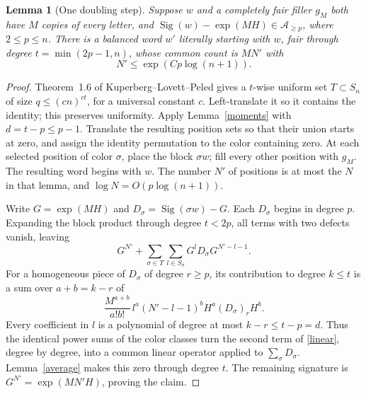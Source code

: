 \documentclass[11pt]{article}
\newtheorem{lemma}{Lemma}
\newcommand{\Sig}{\operatorname{Sig}}
\begin{document}
\begin{lemma}[One doubling step]\label{double}
Suppose $w$ and a completely fair filler $g_M$ both have $M$ copies of
every letter, and $\Sig(w)-\exp(MH)\in\mathcal A_{\ge p}$, where
$2\le p\le n$. There is a balanced word $w'$ literally starting with
$w$, fair through degree $t=\min(2p-1,n)$, whose common count is
$M N'$ with
\[
 N'\le\exp(Cp\log(n+1)).
\]
\end{lemma}
\begin{proof}
Theorem~1.6 of Kuperberg--Lovett--Peled gives a $t$-wise uniform set
$T\subset S_n$ of size $q\le(cn)^{ct}$, for a universal constant $c$.
Left-translate it so it contains the identity; this preserves uniformity.
Apply Lemma~\ref{moments} with $d=t-p\le p-1$.
Translate the resulting position sets so that their union starts at zero,
and assign the identity permutation to the color containing zero.
At each selected position of color $\sigma$, place the block $\sigma w$;
fill every other position with $g_M$. The resulting word begins with $w$.
The number $N'$ of positions is at most the $N$ in that lemma, and
$\log N=O(p\log(n+1))$.

Write $G=\exp(MH)$ and $D_\sigma=\Sig(\sigma w)-G$.
Each $D_\sigma$ begins in degree $p$. Expanding the block product
through degree $t<2p$, all terms with two defects vanish, leaving
\begin{equation}\label{linear}
 G^{N'}+
 \sum_{\sigma\in T}\sum_{l\in S_\sigma}
               G^lD_\sigma G^{N'-l-1}.
\end{equation}
For a homogeneous piece of $D_\sigma$ of degree $r\ge p$, its
contribution to degree $k\le t$ is a sum over $a+b=k-r$ of
\[
 \frac{M^{a+b}}{a!b!}\,l^a(N'-l-1)^b H^a(D_\sigma)_rH^b.
\]
Every coefficient in $l$ is a polynomial of degree at most
$k-r\le t-p=d$. Thus the identical power sums of the color classes
turn the second term of \eqref{linear}, degree by degree, into a
common linear operator applied to $\sum_\sigma D_\sigma$.
Lemma~\ref{average} makes this zero through degree $t$.
The remaining signature is $G^{N'}=\exp(MN'H)$, proving the claim.
\end{proof}
\end{document}
